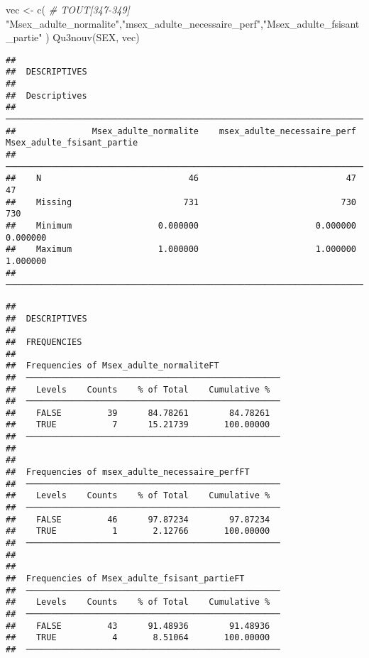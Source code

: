 \documentclass[
]{article}
\newenvironment{Shaded}{\begin{snugshade}}{\end{snugshade}}
\newcommand{\CommentTok}[1]{\textcolor[rgb]{0.56,0.35,0.01}{\textit{#1}}}
\newcommand{\FunctionTok}[1]{\textcolor[rgb]{0.00,0.00,0.00}{#1}}
\newcommand{\NormalTok}[1]{#1}
\newcommand{\OtherTok}[1]{\textcolor[rgb]{0.56,0.35,0.01}{#1}}
\newcommand{\StringTok}[1]{\textcolor[rgb]{0.31,0.60,0.02}{#1}}
\begin{document}
\begin{Shaded}
\begin{Highlighting}[]
\NormalTok{vec }\OtherTok{\textless{}{-}} \FunctionTok{c}\NormalTok{(  }\CommentTok{\# TOUT[347{-}349]}
  \StringTok{"Msex\_adulte\_normalite"}\NormalTok{,}\StringTok{"msex\_adulte\_necessaire\_perf"}\NormalTok{,}\StringTok{"Msex\_adulte\_fsisant\_partie"}
\NormalTok{)}
\FunctionTok{Qu3nouv}\NormalTok{(SEX, vec)}
\end{Highlighting}
\end{Shaded}

\begin{verbatim}
## 
##  DESCRIPTIVES
## 
##  Descriptives                                                                                      
##  ───────────────────────────────────────────────────────────────────────────────────────────────── 
##               Msex_adulte_normalite    msex_adulte_necessaire_perf    Msex_adulte_fsisant_partie   
##  ───────────────────────────────────────────────────────────────────────────────────────────────── 
##    N                             46                             47                            47   
##    Missing                      731                            730                           730   
##    Minimum                 0.000000                       0.000000                      0.000000   
##    Maximum                 1.000000                       1.000000                      1.000000   
##  ─────────────────────────────────────────────────────────────────────────────────────────────────
\end{verbatim}

\begin{verbatim}
## 
##  DESCRIPTIVES
## 
##  FREQUENCIES
## 
##  Frequencies of Msex_adulte_normaliteFT             
##  ────────────────────────────────────────────────── 
##    Levels    Counts    % of Total    Cumulative %   
##  ────────────────────────────────────────────────── 
##    FALSE         39      84.78261        84.78261   
##    TRUE           7      15.21739       100.00000   
##  ────────────────────────────────────────────────── 
## 
## 
##  Frequencies of msex_adulte_necessaire_perfFT       
##  ────────────────────────────────────────────────── 
##    Levels    Counts    % of Total    Cumulative %   
##  ────────────────────────────────────────────────── 
##    FALSE         46      97.87234        97.87234   
##    TRUE           1       2.12766       100.00000   
##  ────────────────────────────────────────────────── 
## 
## 
##  Frequencies of Msex_adulte_fsisant_partieFT        
##  ────────────────────────────────────────────────── 
##    Levels    Counts    % of Total    Cumulative %   
##  ────────────────────────────────────────────────── 
##    FALSE         43      91.48936        91.48936   
##    TRUE           4       8.51064       100.00000   
##  ──────────────────────────────────────────────────
\end{verbatim}
\end{document}
